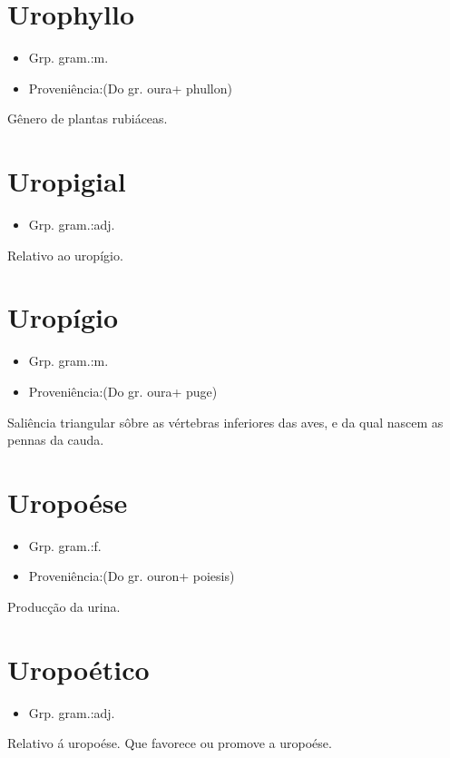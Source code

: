 \documentclass{article}
\begin{document}
\section{Urophyllo}
\begin{itemize}
\item {Grp. gram.:m.}
\end{itemize}
\begin{itemize}
\item {Proveniência:(Do gr. \textunderscore oura\textunderscore  + \textunderscore phullon\textunderscore )}
\end{itemize}
Gênero de plantas rubiáceas.
\section{Uropigial}
\begin{itemize}
\item {Grp. gram.:adj.}
\end{itemize}
Relativo ao uropígio.
\section{Uropígio}
\begin{itemize}
\item {Grp. gram.:m.}
\end{itemize}
\begin{itemize}
\item {Proveniência:(Do gr. \textunderscore oura\textunderscore  + \textunderscore puge\textunderscore )}
\end{itemize}
Saliência triangular sôbre as vértebras inferiores das aves, e da qual nascem as pennas da cauda.
\section{Uropoése}
\begin{itemize}
\item {Grp. gram.:f.}
\end{itemize}
\begin{itemize}
\item {Proveniência:(Do gr. \textunderscore ouron\textunderscore  + \textunderscore poiesis\textunderscore )}
\end{itemize}
Producção da urina.
\section{Uropoético}
\begin{itemize}
\item {Grp. gram.:adj.}
\end{itemize}
Relativo á uropoése.
Que favorece ou promove a uropoése.
\end{document}
